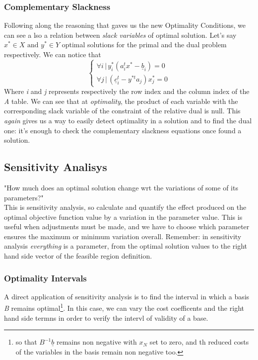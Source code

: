 \documentclass{article}
\begin{document}
			\subsubsection{Complementary Slackness}
			Following along the reasoning that gaves us the new Optimality Conditions, we can see a lso a relation between \textit{slack variables} of optimal solution. Let's say $x^* \in X \text{ and } y^* \in Y$ optimal solutions for the primal and the dual problem respectively. We can notice that
			\begin{equation}
				\begin{cases}
					\forall i \,\vert\, y_i^*(a_i^tx^*-\underline{b}_i) = 0 \\
					\forall j \,\vert\, (\underline{c}_i^t - y^{*t}a_j)x_j^* = 0
				\end{cases}
			\end{equation}
			Where \emph{i} and \emph{j} represents respectively the row index and the column index of the \emph{A} table. We can see that at \textit{optimality}, the product of each variable with the corresponding slack variable of the constraint of the relative dual is null. This \textit{again} gives us a way to easily detect optimality in a solution and to find the dual one: it's enough to check the complementary slackness equations once found a solution.

		\subsection{Sensitivity Analisys}
			"How much does an optimal solution change wrt the variations of some of its parameters?"\\
			This is sensitivity analysis, so calculate and quantify the effect produced on the optimal objective function value by a variation in the parameter value. This is useful when adjustments must be made, and we have to choose which parameter ensures the maximum or minimum variation overall. Remember: in sensitivity analysis \textit{everything} is a parameter, from the optimal solution values to the right hand side vector of the feasible region definition.

			\subsubsection{Optimality Intervals}
				A direct application of sensitivity analysis is to find the interval in which a basis \emph{B} remains optimal\footnote{so that $B^{-1}\underline{b}$ remains non negative with $x_N$ set to zero, and th reduced costs of the variables in the basis remain non negative too.}. In this case, we can vary the cost coefficents and the right hand side termns in order to verify the intervl of validity of a base.
\end{document}

